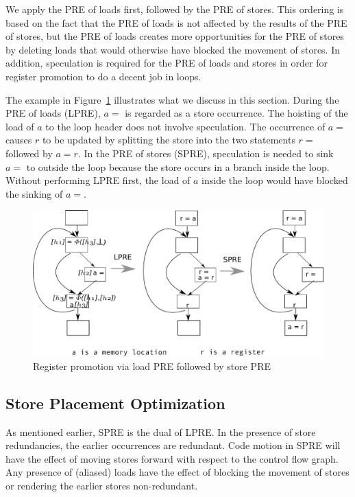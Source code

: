 We apply the PRE of loads
first, followed by the PRE of stores.  This ordering is based on the fact that
the PRE of loads is not affected by the results of the PRE of stores, but the
PRE of loads creates more opportunities for the PRE of stores by deleting
loads that would otherwise have blocked the movement of stores.  In addition,
speculation is required for the PRE of loads and stores in order for register
promotion to do a decent job in loops.  

The example in Figure~\ref{fig: promotion-example} illustrates what we discuss
in this section.  During the PRE of loads (LPRE), $a =$ is regarded as a
store occurrence.  The hoisting of the load of $a$ to the loop header does
not involve speculation. The occurrence of $a =$ causes $r$ to be updated
by splitting the store into the two statements $r =$ followed by $a = r$.  In 
the PRE of stores (SPRE), speculation is needed to sink $a =$ to outside the
loop because the store occurs in a branch inside the loop.  Without performing 
LPRE first, the load of $a$ inside the loop would
have blocked the sinking of $a =$.

\begin{figure}
\centering
\includegraphics[scale=0.55]{fig-promotion-example.pdf}
\caption{Register promotion via load PRE followed by store PRE}
\label{fig: promotion-example}
\end{figure}

\subsection{Store Placement Optimization}

As mentioned earlier, SPRE is the dual of LPRE.
In the presence of store redundancies, the earlier occurrences are redundant.
Code motion in SPRE will have the effect of moving stores forward with respect 
to the control flow graph.  Any presence of (aliased) loads have the effect of
blocking the movement of stores or rendering the earlier stores non-redundant.

